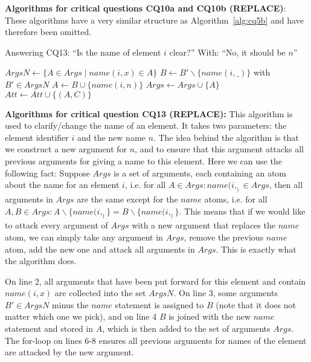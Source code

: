\noindent\textbf{Algorithms for critical questions CQ10a and CQ10b (REPLACE)}: These algorithms have a very similar structure as Algorithm~\ref{alg:cq5b} and have therefore been omitted.

\begin{algorithm}[h]
  \caption{Answering CQ13: ``Is the name of element $i$ clear?'' With: ``No, it should be $n$''}\label{alg:cq13}
  \begin{algorithmic}[1]
    \State $ArgsN \gets\{ A\in Args \mid name(i,x)\in A\}$
    \State $B\gets B'\backslash \{name(i,\_)\}$ with $B'\in ArgsN$
    \State $A \gets B \cup \{name(i,n)\}$
    \State $Args \gets Args \cup \{A\}$
      \State $Att\gets Att \cup \{(A,C)\}$
    \EndFor
    \EndProcedure
  \end{algorithmic}
\end{algorithm}

\noindent\textbf{Algorithms for critical question CQ13 (REPLACE):}  This algorithm is used to clarify/change the name of an element. It takes two parameters: the element identifier $i$ and the new name $n$. The idea behind the algorithm is that we construct a new argument for $n$, and to ensure that this argument attacks all previous arguments for giving a name to this element. Here we can use the following fact: Suppose $Args$ is a set of arguments, each containing an atom about the name for an element $i$, i.e. for all $A\in Args: name(i,_)\in Args$, then all arguments in $Args$ are the same except for the $name$ atoms, i.e. for all $A,B\in Args: A\backslash\{name(i,_)\} = B\backslash\{name(i,_)\}$. This means that if we would like to attack every argument of $Args$ with a new argument that replaces the $name$ atom, we can simply take any argument in $Args$, remove the previous $name$ atom, add the new one and attack all arguments in $Args$. This is exactly what the algorithm does.


On line 2, all arguments that have been put forward for this element and contain $name(i,x)$ are collected into the set $ArgsN$. On line 3, some arguments $B'\in ArgsN$ minus the $name$ statement is assigned to $B$ (note that it does not matter which one we pick), and on line 4 $B$ is joined with the new $name$ statement and stored in $A$, which is then added to the set of arguments $Args$. The for-loop on lines 6-8 ensures all previous arguments for names of the element are attacked by the new argument.


